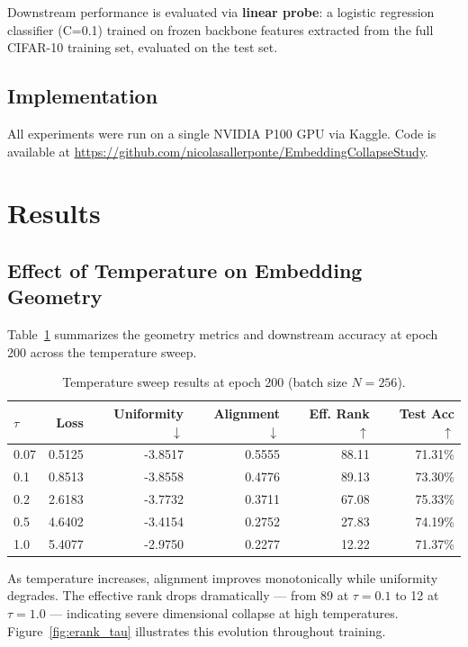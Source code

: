 \documentclass{article}
\begin{document}
Downstream performance is evaluated via \textbf{linear probe}: a logistic 
regression classifier (C=0.1) trained on frozen backbone features extracted 
from the full CIFAR-10 training set, evaluated on the test set.

\subsection{Implementation}

All experiments were run on a single NVIDIA P100 GPU via Kaggle. Code is 
available at \url{https://github.com/nicolasallerponte/EmbeddingCollapseStudy}.

\section{Results}

\subsection{Effect of Temperature on Embedding Geometry}

Table~\ref{tab:tau_sweep} summarizes the geometry metrics and downstream 
accuracy at epoch 200 across the temperature sweep.

\begin{table}[h]
\centering
\caption{Temperature sweep results at epoch 200 (batch size $N=256$).}
\label{tab:tau_sweep}
\begin{tabular}{lrrrrr}
\toprule
$\tau$ & Loss & Uniformity $\downarrow$ & Alignment $\downarrow$ & Eff. Rank $\uparrow$ & Test Acc $\uparrow$ \\
\midrule
0.07 & 0.5125 & -3.8517 & 0.5555 & 88.11 & 71.31\% \\
0.1  & 0.8513 & -3.8558 & 0.4776 & 89.13 & 73.30\% \\
0.2  & 2.6183 & -3.7732 & 0.3711 & 67.08 & 75.33\% \\
0.5  & 4.6402 & -3.4154 & 0.2752 & 27.83 & 74.19\% \\
1.0  & 5.4077 & -2.9750 & 0.2277 & 12.22 & 71.37\% \\
\bottomrule
\end{tabular}
\end{table}

As temperature increases, alignment improves monotonically while uniformity 
degrades. The effective rank drops dramatically --- from 89 at $\tau=0.1$ to 
12 at $\tau=1.0$ --- indicating severe dimensional collapse at high temperatures. 
Figure~\ref{fig:erank_tau} illustrates this evolution throughout training.
\end{document}
